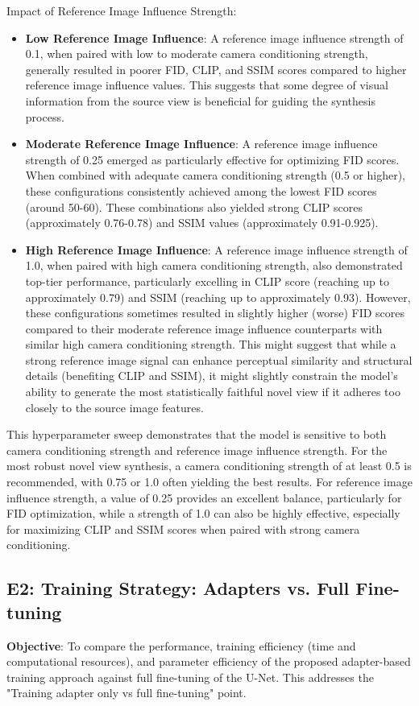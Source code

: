 Impact of Reference Image Influence Strength:
\begin{itemize}
  \item \textbf{Low Reference Image Influence}: A reference image influence strength of 0.1, when paired with low to moderate camera conditioning strength, generally resulted in poorer FID, CLIP, and SSIM scores compared to higher reference image influence values. This suggests that some degree of visual information from the source view is beneficial for guiding the synthesis process.
  \item \textbf{Moderate Reference Image Influence}: A reference image influence strength of 0.25 emerged as particularly effective for optimizing FID scores. When combined with adequate camera conditioning strength (0.5 or higher), these configurations consistently achieved among the lowest FID scores (around 50-60). These combinations also yielded strong CLIP scores (approximately 0.76-0.78) and SSIM values (approximately 0.91-0.925).
  \item \textbf{High Reference Image Influence}: A reference image influence strength of 1.0, when paired with high camera conditioning strength, also demonstrated top-tier performance, particularly excelling in CLIP score (reaching up to approximately 0.79) and SSIM (reaching up to approximately 0.93). However, these configurations sometimes resulted in slightly higher (worse) FID scores compared to their moderate reference image influence counterparts with similar high camera conditioning strength. This might suggest that while a strong reference image signal can enhance perceptual similarity and structural details (benefiting CLIP and SSIM), it might slightly constrain the model's ability to generate the most statistically faithful novel view if it adheres too closely to the source image features.
\end{itemize}

This hyperparameter sweep demonstrates that the model is sensitive to both camera conditioning strength and reference image influence strength. For the most robust novel view synthesis, a camera conditioning strength of at least 0.5 is recommended, with 0.75 or 1.0 often yielding the best results. For reference image influence strength, a value of 0.25 provides an excellent balance, particularly for FID optimization, while a strength of 1.0 can also be highly effective, especially for maximizing CLIP and SSIM scores when paired with strong camera conditioning.

\subsection{E2: Training Strategy: Adapters vs. Full Fine-tuning}\label{ssec:exp_adapters_vs_full_finetuning}
\textbf{Objective}:
To compare the performance, training efficiency (time and computational resources), and parameter efficiency of the proposed adapter-based training approach against full fine-tuning of the U-Net. This addresses the "Training adapter only vs full fine-tuning" point.

